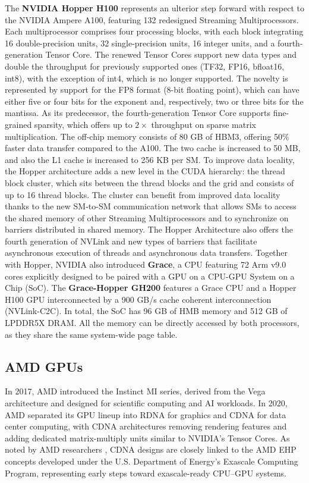 The \textbf{NVIDIA Hopper H100} \cite{Choquette2023} represents an ulterior step forward with respect to the NVIDIA Ampere A100, featuring 132 redesigned Streaming Multiprocessors. Each multiprocessor comprises four processing blocks, with each block integrating 16 double-precision units, 32 single-precision units, 16 integer units, and a fourth-generation Tensor Core.
The renewed Tensor Cores support new data types and double the throughput for previously supported ones (TF32, FP16, bfloat16, int8), with the exception of int4, which is no longer supported. The novelty is represented by support for the FP8 format (8-bit floating point), which can have either five or four bits for the exponent and, respectively, two or three bits for the mantissa.
As its predecessor, the fourth-generation Tensor Core supports fine-grained sparsity, which offers up to $2\times$ throughput on sparse matrix multiplication.
The off-chip memory consists of 80 GB of HBM3, offering 50\% faster data transfer compared to the A100. The two cache is increased to 50 MB, and also the L1 cache is increased to 256 KB per SM.
To improve data locality, the Hopper architecture adds a new level in the CUDA hierarchy: the thread block cluster, which sits between the thread blocks and the grid and consists of up to 16 thread blocks. The cluster can benefit from improved data locality thanks to the new SM-to-SM communication network that allows SMs to access the shared memory of other Streaming Multiprocessors and to synchronize on barriers distributed in shared memory.
The Hopper Architecture also offers the fourth generation of NVLink and new types of barriers that facilitate asynchronous execution of threads and asynchronous data transfers.
Together with Hopper, NVIDIA also introduced \textbf{Grace}, a CPU featuring 72 Arm v9.0 cores explicitly designed to be paired with a GPU on a CPU-GPU System on a Chip (SoC). 
The \textbf{Grace-Hopper GH200} features a Grace CPU and a Hopper H100 GPU interconnected by a 900 GB/s cache coherent interconnection (NVLink-C2C). In total, the SoC has 96 GB of HMB memory and 512 GB of LPDDR5X DRAM. All the memory can be directly accessed by both processors, as they share the same system-wide page table.

\subsection{AMD GPUs}

In 2017, AMD introduced the Instinct MI series, derived from the Vega architecture and designed for scientific computing and AI workloads. In 2020, AMD separated its GPU lineup into RDNA for graphics and CDNA for data center computing, with CDNA architectures removing rendering features and adding dedicated matrix-multiply units similar to NVIDIA’s Tensor Cores. As noted by AMD researchers \cite{Loh2023}\cite{Smith2024}, CDNA designs are closely linked to the AMD EHP concepts developed under the U.S. Department of Energy’s Exascale Computing Program, representing early steps toward exascale-ready CPU–GPU systems.

